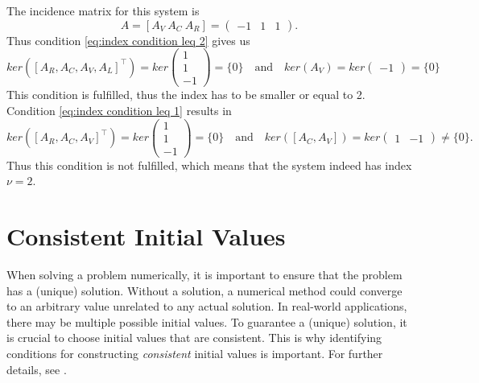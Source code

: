 \begin{example3}
	The incidence matrix for this system is
	\begin{displaymath}
		A = [A_V~A_C~A_R] = 
		\left(
		\begin{matrix}
			-1 & 1 & 1
		\end{matrix}
		\right).
	\end{displaymath} 
	Thus condition \eqref{eq:index condition leq 2} gives us
	\begin{displaymath}
		ker([A_R, A_C, A_V, A_L]^\top) = ker
		\left(
		\begin{matrix}
			1 \\
			1 \\ 
			-1
		\end{matrix}
		\right) = \{0\}
		\quad \text{and} \quad 
		ker(A_V) = ker
		\left(
		\begin{matrix}
			-1
		\end{matrix}
		\right) = \{0\}
	\end{displaymath}
	This condition is fulfilled, thus the index has to be smaller or equal to 2.
	Condition \eqref{eq:index condition leq 1} results in
	\begin{displaymath}
		ker([A_R, A_C, A_V]^\top) = ker\left(
		\begin{matrix}
			1 \\
			1 \\
			-1
		\end{matrix}
		\right) = \{0\}
		\quad \text{and} \quad
		ker([A_C, A_V]) = ker
		\left(
		\begin{matrix}
			1 & -1
		\end{matrix}
		\right) \neq \{0\}.
	\end{displaymath}
	Thus this condition is not fulfilled, which means that the system indeed has index $\nu = 2$.
\end{example3}
	
	
\section{Consistent Initial Values}
\label{sec:consistant initial values}

When solving a problem numerically, it is important to ensure that the problem has a (unique) solution. Without a solution, a numerical method could converge to an arbitrary value unrelated to any actual solution. In real-world applications, there may be multiple possible initial values. To guarantee a (unique) solution, it is crucial to choose initial values that are consistent. This is why identifying conditions for constructing \emph{consistent} initial values is important. For further details, see .

